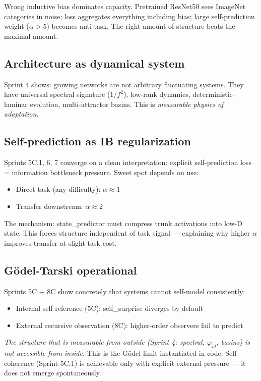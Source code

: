 \documentclass[11pt]{article}
\begin{document}
Wrong inductive bias dominates capacity. Pretrained ResNet50 sees ImageNet categories in noise; loss aggregates everything including bias; large self-prediction weight ($\alpha{>}5$) becomes anti-task. The right amount of structure beats the maximal amount.

\subsection{Architecture as dynamical system}
Sprint 4 shows: growing networks are not arbitrary fluctuating systems. They have universal spectral signature ($1/f^2$), low-rank dynamics, deterministic-laminar evolution, multi-attractor basins. This is \emph{measurable physics of adaptation}.

\subsection{Self-prediction as IB regularization}
Sprints 5C.1, 6, 7 converge on a clean interpretation: explicit self-prediction loss = information bottleneck pressure. Sweet spot depends on use:
\begin{itemize}
    \item Direct task (any difficulty): $\alpha \approx 1$
    \item Transfer downstream: $\alpha \approx 2$
\end{itemize}

The mechanism: state\_predictor must compress trunk activations into low-D state. This forces structure independent of task signal --- explaining why higher $\alpha$ improves transfer at slight task cost.

\subsection{Gödel-Tarski operational}
Sprints 5C + 8C show concretely that systems cannot self-model consistently:
\begin{itemize}
    \item Internal self-reference (5C): self\_surprise diverges by default
    \item External recursive observation (8C): higher-order observers fail to predict
\end{itemize}

\emph{The structure that is measurable from outside (Sprint 4: spectral, $\varphi_{id}$, basins) is not accessible from inside.} This is the Gödel limit instantiated in code. Self-coherence (Sprint 5C.1) is achievable only with explicit external pressure --- it does not emerge spontaneously.
\end{document}
